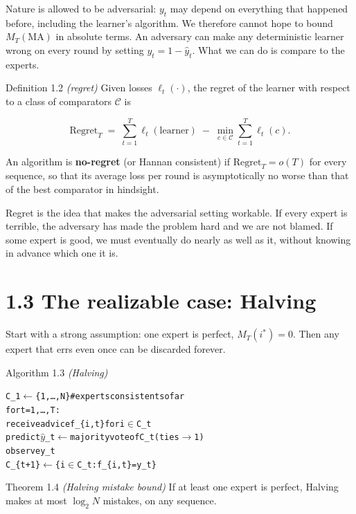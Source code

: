 \documentclass[11pt,a4paper,openany]{book}
\newcommand{\Reg}{\mathrm{Regret}}
\newcommand{\hy}{\hat{y}}
\newenvironment{algo}{\par\smallskip\begingroup\footnotesize\begin{alltt}}{\end{alltt}\endgroup\smallskip}
\begin{document}
Nature is allowed to be adversarial: $y_t$ may depend on everything that happened before, including the learner's algorithm. We therefore cannot hope to bound $M_T(\mathrm{MA})$ in absolute terms. An adversary can make any deterministic learner wrong on every round by setting $y_t = 1-\hy_t$. What we can do is compare to the experts.

\begin{bdef}{Definition 1.2 \emph{(regret)}}
Given losses $\ell_t(\cdot)$, the regret of the learner with respect to a class of comparators $\mathcal{C}$ is

\[\Reg_T \;=\; \sum_{t=1}^T \ell_t(\text{learner}) \;-\; \min_{c\in\mathcal C}\sum_{t=1}^T \ell_t(c).\]

An algorithm is \textbf{no-regret} (or Hannan consistent) if $\Reg_T = o(T)$ for every sequence, so that its average loss per round is asymptotically no worse than that of the best comparator in hindsight.
\end{bdef}

Regret is the idea that makes the adversarial setting workable. If every expert is terrible, the adversary has made the problem hard and we are not blamed. If some expert is good, we must eventually do nearly as well as it, without knowing in advance which one it is.

\section*{1.3 The realizable case: Halving}\label{ch1-halving}

Start with a strong assumption: one expert is perfect, $M_T(i^*) = 0$. Then any expert that errs even once can be discarded forever.

\begin{balg}{Algorithm 1.3 \emph{(Halving)}}
\begin{algo}
C\_1 \ensuremath{\leftarrow} \{1, …, N\}                       \# experts consistent so far
for t = 1, …, T:
    receive advice f\_\{i,t\} for i \ensuremath{\in} C\_t
    predict \ensuremath{\hat{y}}\_t \ensuremath{\leftarrow} majority vote of C\_t    (ties \ensuremath{\to} 1)
    observe y\_t
    C\_\{t+1\} \ensuremath{\leftarrow} \{ i \ensuremath{\in} C\_t : f\_\{i,t\} = y\_t \}
\end{algo}
\end{balg}

\begin{bthm}{Theorem 1.4 \emph{(Halving mistake bound)}}
If at least one expert is perfect, Halving makes at most $\log_2 N$ mistakes, on any sequence.
\end{bthm}
\end{document}

